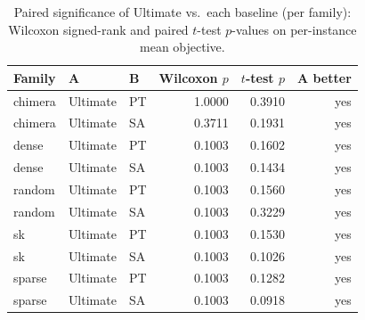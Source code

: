 \begin{table}[t]
  \centering
  \caption{Paired significance of Ultimate vs.\ each baseline (per family): Wilcoxon signed-rank and paired $t$-test $p$-values on per-instance mean objective.}
  \begin{tabular}{lllrrr}
    \toprule
    Family & A & B & Wilcoxon $p$ & $t$-test $p$ & A better \\
    \midrule
    chimera & Ultimate & PT & 1.0000 & 0.3910 & yes \\
    chimera & Ultimate & SA & 0.3711 & 0.1931 & yes \\
    dense & Ultimate & PT & 0.1003 & 0.1602 & yes \\
    dense & Ultimate & SA & 0.1003 & 0.1434 & yes \\
    random & Ultimate & PT & 0.1003 & 0.1560 & yes \\
    random & Ultimate & SA & 0.1003 & 0.3229 & yes \\
    sk & Ultimate & PT & 0.1003 & 0.1530 & yes \\
    sk & Ultimate & SA & 0.1003 & 0.1026 & yes \\
    sparse & Ultimate & PT & 0.1003 & 0.1282 & yes \\
    sparse & Ultimate & SA & 0.1003 & 0.0918 & yes \\
    \bottomrule
  \end{tabular}
\end{table}

